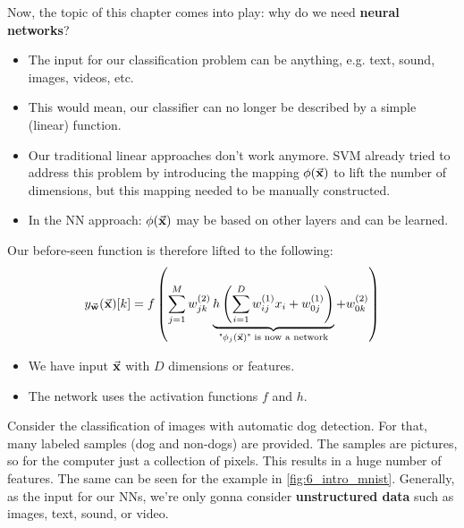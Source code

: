 Now, the topic of this chapter comes into play: why do we need \textbf{neural networks}?
\begin{itemize}
  \item The input for our classification problem can be anything, e.g. text, sound, images, videos, etc.
  \item This would mean, our classifier can no longer be described by a simple (linear) function.
  \item Our traditional linear approaches don't work anymore. SVM already tried to address this problem by introducing the mapping $\phi(\vec{\mathbf{x}})$ to lift the number of dimensions, but this mapping needed to be manually constructed.
  \item In the NN approach: $\phi(\vec{\mathbf{x}})$ may be based on other layers and can be learned.
\end{itemize}

Our before-seen function is therefore lifted to the following:
\begin{align*}
  y_{\vec{\mathbf{w}}}(\vec{\mathbf{x}})[k] = f\left(
    \sum_{j=1}^M w_{jk}^{(2)} \underbrace{
      h\left(
        \sum_{i=1}^D w_{ij}^{(1)} x_i + w_{0j}^{(1)}
      \right)}_{\textnormal{\color{black}{"}}\phi_j(\vec{\mathbf{x}}) \textnormal{\color{black}{" is now a network}}}
    + w_{0k}^{(2)}
  \right)
\end{align*}
\begin{itemize}
  \item We have input $\vec{\mathbf{x}}$ with $D$ dimensions or features.
  \item The network uses the activation functions $f$ and $h$.
\end{itemize}

Consider the classification of images with automatic dog detection. For that, many labeled samples (dog and non-dogs) are provided. The samples are pictures, so for the computer just a collection of pixels. This results in a huge number of features. The same can be seen for the example in \ref{fig:6_intro_mnist}. Generally, as the input for our NNs, we're only gonna consider \textbf{unstructured data} such as images, text, sound, or video.

